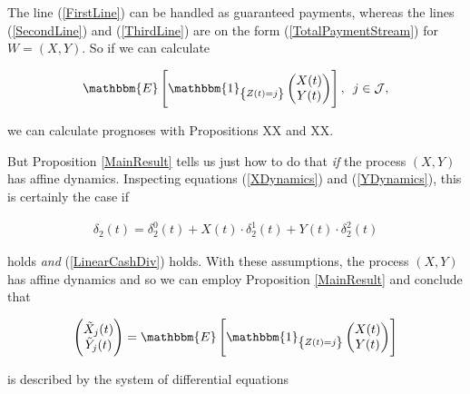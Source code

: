 \documentclass{book}
\newcommand{\1}[1]{\mathbbm{1}_{\left\lbrace #1 \right\rbrace}}
\newcommand{\expec}[1][def]{\mathbbm{E} \left[ #1 \right]}
\theoremstyle{break}
\theoremstyle{remark}
\numberwithin{equation}{section}
\begin{document}
The line (\ref{FirstLine}) can be handled as guaranteed payments, whereas the lines (\ref{SecondLine}) and (\ref{ThirdLine}) are on the form (\ref{TotalPaymentStream}) for $W=(X,Y)$. So if we can calculate
	
\begin{align*}
	\expec[\1{Z(t)=j}\begin{pmatrix}X(t) \\ Y(t)\end{pmatrix}], \, \, \, j \in \mathcal{J},
\end{align*}
	
we can calculate prognoses with Propositions XX and XX.


But Proposition \ref{MainResult} tells us just how to do that \textit{if} the process $(X,Y)$ has affine dynamics. Inspecting equations (\ref{XDynamics}) and (\ref{YDynamics}), this is certainly the case if

\begin{align*}
	\delta_2(t) = \delta_2^0(t) + X(t) \cdot \delta_2^1(t) + Y(t) \cdot \delta_2^2(t)
\end{align*}

holds \textit{and} (\ref{LinearCashDiv}) holds. With these assumptions, the process $(X,Y)$ has affine dynamics and so we can employ Proposition \ref{MainResult} and conclude that

\begin{align*}
\begin{pmatrix}\tilde{X}_j(t) \\ \tilde{Y}_j(t)\end{pmatrix} = \expec[\1{Z(t)=j}\begin{pmatrix}X(t) \\ Y(t)\end{pmatrix}]
\end{align*}

is described by the system of differential equations
\end{document}
